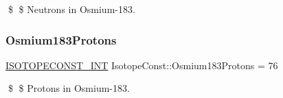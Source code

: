 \$ \$ Neutrons in Osmium-\/183. \mbox{\label{group___isotope_const-_osmium-_os183_ga6c207b1f9ff6889c97556f77bbc2b6f8}} 
\subsubsection{\texorpdfstring{Osmium183\+Protons}{Osmium183Protons}}
{\footnotesize\ttfamily \mbox{\hyperlink{group___isotope_const-_macros_ga5f18360b3e99483a35c32d789e62621c}{I\+S\+O\+T\+O\+P\+E\+C\+O\+N\+S\+T\+\_\+\+I\+NT}} Isotope\+Const\+::\+Osmium183\+Protons = 76}

\$ \$ Protons in Osmium-\/183. 